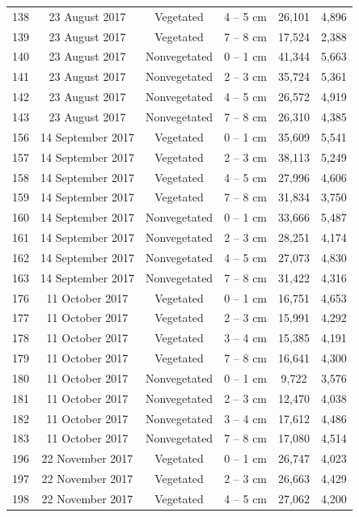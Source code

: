 \documentclass[12pt,]{article}
\begin{document}
\begin{longtable}[t]{cccccc}
138 & 23 August 2017 & Vegetated & 4 – 5 cm & 26,101 & 4,896\\
139 & 23 August 2017 & Vegetated & 7 – 8 cm & 17,524 & 2,388\\
140 & 23 August 2017 & Nonvegetated & 0 – 1 cm & 41,344 & 5,663\\
141 & 23 August 2017 & Nonvegetated & 2 – 3 cm & 35,724 & 5,361\\
142 & 23 August 2017 & Nonvegetated & 4 – 5 cm & 26,572 & 4,919\\
143 & 23 August 2017 & Nonvegetated & 7 – 8 cm & 26,310 & 4,385\\
156 & 14 September 2017 & Vegetated & 0 – 1 cm & 35,609 & 5,541\\
157 & 14 September 2017 & Vegetated & 2 – 3 cm & 38,113 & 5,249\\
158 & 14 September 2017 & Vegetated & 4 – 5 cm & 27,996 & 4,606\\
159 & 14 September 2017 & Vegetated & 7 – 8 cm & 31,834 & 3,750\\
160 & 14 September 2017 & Nonvegetated & 0 – 1 cm & 33,666 & 5,487\\
161 & 14 September 2017 & Nonvegetated & 2 – 3 cm & 28,251 & 4,174\\
162 & 14 September 2017 & Nonvegetated & 4 – 5 cm & 27,073 & 4,830\\
163 & 14 September 2017 & Nonvegetated & 7 – 8 cm & 31,422 & 4,316\\
176 & 11 October 2017 & Vegetated & 0 – 1 cm & 16,751 & 4,653\\
177 & 11 October 2017 & Vegetated & 2 – 3 cm & 15,991 & 4,292\\
178 & 11 October 2017 & Vegetated & 3 – 4 cm & 15,385 & 4,191\\
179 & 11 October 2017 & Vegetated & 7 – 8 cm & 16,641 & 4,300\\
180 & 11 October 2017 & Nonvegetated & 0 – 1 cm & 9,722 & 3,576\\
181 & 11 October 2017 & Nonvegetated & 2 – 3 cm & 12,470 & 4,038\\
182 & 11 October 2017 & Nonvegetated & 3 – 4 cm & 17,612 & 4,486\\
183 & 11 October 2017 & Nonvegetated & 7 – 8 cm & 17,080 & 4,514\\
196 & 22 November 2017 & Vegetated & 0 – 1 cm & 26,747 & 4,023\\
197 & 22 November 2017 & Vegetated & 2 – 3 cm & 26,663 & 4,429\\
198 & 22 November 2017 & Vegetated & 4 – 5 cm & 27,062 & 4,200\\

\end{longtable}
\end{document}
